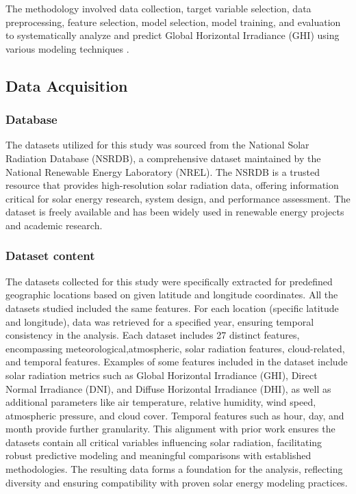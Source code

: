 \documentclass[10pt,twocolumn]{article}
\begin{document}
\begin{itemize}
The methodology involved data collection, target variable selection, data preprocessing, feature selection, model selection, model training, and evaluation to systematically analyze and predict Global Horizontal Irradiance (GHI) using various modeling techniques . 

\subsection{Data Acquisition} 
\subsubsection{Database}
The datasets utilized for this study was sourced from the National Solar Radiation Database (NSRDB), a comprehensive dataset maintained by the National Renewable Energy Laboratory (NREL). The NSRDB is a trusted resource that provides high-resolution solar radiation data, offering information critical for solar energy research, system design, and performance assessment. The dataset is freely available and has been widely used in renewable energy projects and academic research.
\subsubsection{Dataset content}
The datasets collected for this study were specifically extracted for predefined geographic locations based on given latitude and longitude coordinates. All the datasets studied included the same features. For each location (specific latitude and longitude), data was retrieved for a specified year, ensuring temporal consistency in the analysis. Each dataset includes 27 distinct features, encompassing meteorological,atmospheric, solar radiation features, cloud-related, and temporal features. Examples of some features included in the dataset include solar radiation metrics such as Global Horizontal Irradiance (GHI), Direct Normal Irradiance (DNI), and Diffuse Horizontal Irradiance (DHI), as well as additional parameters like air temperature, relative humidity, wind speed, atmospheric pressure, and cloud cover. Temporal features such as hour, day, and month provide further granularity.
This alignment with prior work ensures the datasets contain all critical variables influencing solar radiation, facilitating robust predictive modeling and meaningful comparisons with established methodologies. The resulting data forms a foundation for the analysis, reflecting diversity and ensuring compatibility with proven solar energy modeling practices.




\end{itemize}
\end{document}
